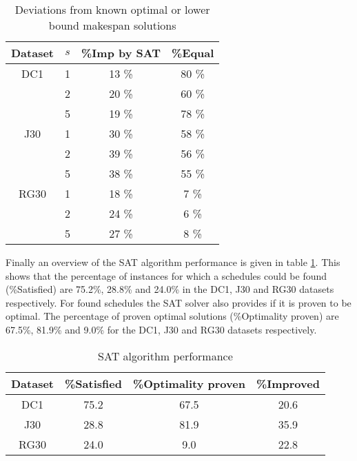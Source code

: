 \begin{table}
	\begin{center}
		\caption{Deviations from known optimal or lower bound makespan solutions}
		\label{table:table5}
		\begin{tabular}{ c | c c c }
			Dataset & \(s\) & \%Imp by SAT & \%Equal \\
			\hline
			DC1 & 1 & 13 \% & 80 \% \\ 
			  	& 2 & 20 \% & 60 \%\\  
			  	& 5 & 19 \% & 78 \%\\ 
			J30 & 1 & 30 \% & 58 \%\\ 
			  	& 2 & 39 \% & 56 \%\\  
			  	& 5 & 38 \% & 55 \%\\ 
			RG30 & 1 & 18 \% & 7 \%\\ 
			 	 & 2 & 24 \% & 6 \%\\  
			 	 & 5 & 27 \% & 8 \%
		\end{tabular}
	\end{center}
\end{table}

Finally an overview of the SAT algorithm performance is given in table \ref{table:table5}. This shows that the percentage of instances for which a schedules could be found (\%Satisfied) are 75.2\%, 28.8\% and 24.0\% in the DC1, J30 and RG30 datasets respectively. For found schedules the SAT solver also provides if it is proven to be optimal. The percentage of proven optimal solutions (\%Optimality proven) are 67.5\%, 81.9\% and 9.0\% for the DC1, J30 and RG30 datasets respectively.

\begin{table}
	\begin{center}
		\caption{SAT algorithm performance}
		\label{table:table6}
		\begin{tabular}{ c | c c c }
			Dataset & \%Satisfied & \%Optimality proven & \%Improved \\
			\hline
			DC1 & 75.2 & 67.5 & 20.6 \\
			J30 & 28.8 & 81.9 & 35.9 \\ 
			RG30 & 24.0 & 9.0 & 22.8
		\end{tabular}
	\end{center}
\end{table}



